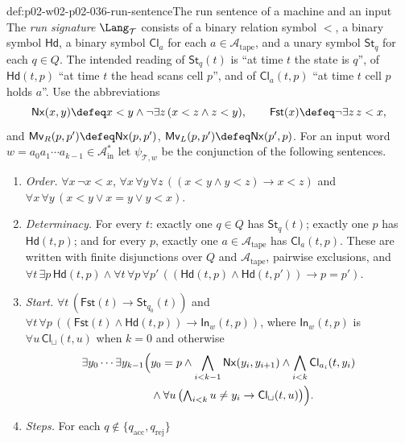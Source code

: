 \begin{hbdefinition}{def:p02-w02-p02-036-run-sentence}{The run sentence of a machine and an input}
The \emph{run signature} \(\Lang_{\mathcal T}\) consists of a binary relation
symbol \(<\), a binary symbol \(\mathsf{Hd}\), a binary symbol
\(\mathsf{Cl}_a\) for each \(a\in\mathcal A_{\mathrm{tape}}\), and a unary
symbol \(\mathsf{St}_q\) for each \(q\in Q\).  The intended reading of
\(\mathsf{St}_q(t)\) is ``at time \(t\) the state is \(q\)'', of
\(\mathsf{Hd}(t,p)\) ``at time \(t\) the head scans cell \(p\)'', and of
\(\mathsf{Cl}_a(t,p)\) ``at time \(t\) cell \(p\) holds \(a\)''.  Use the
abbreviations
\[
 \mathsf{Nx}(x,y)\defeq x<y\land\neg\exists z\,(x<z\land z<y),
 \qquad
 \mathsf{Fst}(x)\defeq\neg\exists z\,z<x ,
\]
and \(\mathsf{Mv}_R(p,p')\defeq\mathsf{Nx}(p,p')\),
\(\mathsf{Mv}_L(p,p')\defeq\mathsf{Nx}(p',p)\).  For an input word
\(w=a_0a_1\cdots a_{k-1}\in\mathcal A_{\mathrm{in}}^*\) let
\(\psi_{\mathcal T,w}\) be the conjunction of the following sentences.
\begin{enumerate}
\item \emph{Order.} \(\forall x\,\neg x<x\),
  \(\forall x\,\forall y\,\forall z\,((x<y\land y<z)\to x<z)\) and
  \(\forall x\,\forall y\,(x<y\lor x=y\lor y<x)\).
\item \emph{Determinacy.} For every \(t\): exactly one \(q\in Q\) has
  \(\mathsf{St}_q(t)\); exactly one \(p\) has \(\mathsf{Hd}(t,p)\); and for
  every \(p\), exactly one \(a\in\mathcal A_{\mathrm{tape}}\) has
  \(\mathsf{Cl}_a(t,p)\).  These are written with finite disjunctions over
  \(Q\) and \(\mathcal A_{\mathrm{tape}}\), pairwise exclusions, and
  \(\forall t\,\exists p\,\mathsf{Hd}(t,p)\land\forall t\,\forall p\,\forall p'\,
  ((\mathsf{Hd}(t,p)\land\mathsf{Hd}(t,p'))\to p=p')\).
\item \emph{Start.} \(\forall t\,(\mathsf{Fst}(t)\to\mathsf{St}_{q_0}(t))\) and
  \(\forall t\,\forall p\,((\mathsf{Fst}(t)\land\mathsf{Hd}(t,p))\to
  \mathsf{In}_w(t,p))\), where \(\mathsf{In}_w(t,p)\) is
  \(\forall u\,\mathsf{Cl}_{\sqcup}(t,u)\) when \(k=0\) and otherwise
  \[
  \begin{aligned}
   \exists y_0\cdots\exists y_{k-1}\Bigl(&y_0=p\land
   \bigwedge_{i<k-1}\mathsf{Nx}(y_i,y_{i+1})\land
   \bigwedge_{i<k}\mathsf{Cl}_{a_i}(t,y_i)\\
   &\land\forall u\,\bigl(\textstyle\bigwedge_{i<k}u\neq y_i\to
   \mathsf{Cl}_{\sqcup}(t,u)\bigr)\Bigr).
  \end{aligned}
  \]
\item \emph{Steps.} For each \(q\notin\{q_{\mathrm{acc}},q_{\mathrm{rej}}\}\)

\end{enumerate}
\end{hbdefinition}
